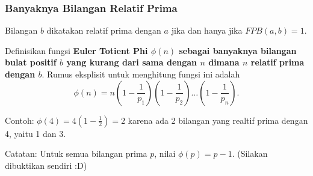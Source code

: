 \subsubsection{Banyaknya Bilangan Relatif Prima}
\begin{remark*}
         Bilangan $b$ dikatakan relatif prima dengan $a$ jika dan hanya jika $FPB(a,b)=1$.
    \end{remark*}
 Definisikan fungsi \textbf{Euler Totient Phi $\phi(n)$ sebagai banyaknya bilangan bulat positif $b$ yang kurang dari sama dengan $n$ dimana $n$ relatif prima dengan $b$}. Rumus eksplisit untuk menghitung fungsi ini adalah
$$\phi(n) = n\left(1-\dfrac{1}{p_1}\right)\left(1-\dfrac{1}{p_2}\right)\dots\left(1-\dfrac{1}{p_n}\right).$$

Contoh: $\phi(4)=4(1-\frac{1}{2})=2$ karena ada 2 bilangan yang realtif prima dengan 4, yaitu 1 dan 3.

Catatan: Untuk semua bilangan prima $p$, nilai $\phi(p) = p-1$. (Silakan dibuktikan sendiri :D)